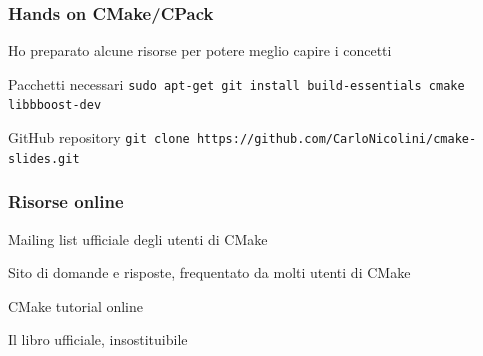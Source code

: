 \documentclass[10pt] {beamer}
\begin{document}

\begin{frame}
\frametitle{Hands on CMake/CPack}

Ho preparato alcune risorse per potere meglio capire i concetti 
\begin{block}{Pacchetti necessari}
\texttt{sudo apt-get git install build-essentials cmake libbboost-dev}
\end{block}

\begin{block}{GitHub repository}
\texttt{git clone https://github.com/CarloNicolini/cmake-slides.git} 
\end{block}

\end{frame}


\begin{frame}
\frametitle{Risorse online}
\begin{thebibliography}{10}

\beamertemplatearticlebibitems

Mailing list ufficiale degli utenti di CMake

Sito di domande e risposte, frequentato da molti utenti di CMake

CMake tutorial online

Il libro ufficiale, insostituibile
\end{thebibliography}
\end{frame}

\end{document}
